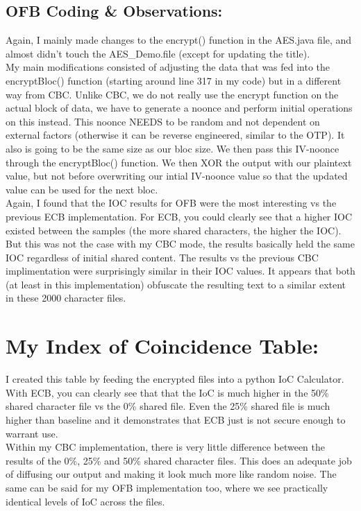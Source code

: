 \documentclass[10pt]{article}
\begin{document}
\begin{enumerate}
	\subsection{OFB Coding \& Observations: }
	\noindent Again, I mainly made changes to the encrypt() function in the AES.java file, and almost didn't touch the AES\_Demo.file (except for updating the title). \\
	My main modifications consisted of adjusting the data that was fed into the encryptBloc() function (starting around line 317 in my code) but in a different way from CBC. Unlike CBC, we do not really use the encrypt function on the actual block of data, we have to generate a noonce and perform initial operations on this instead. This noonce NEEDS to be random and not dependent on external factors (otherwise it can be reverse engineered, similar to the OTP). It also is going to be the same size as our bloc size. We then pass this IV-noonce through the encryptBloc() function. We then XOR the output with our plaintext value, but not before overwriting our intial IV-noonce value so that the updated value can be used for the next bloc.\\
	\newline
	\noindent Again, I found that the IOC results for OFB were the most interesting vs the previous ECB implementation. For ECB, you could clearly see that a higher IOC existed between the samples (the more shared characters, the higher the IOC). But this was not the case with my CBC mode, the results basically held the same IOC regardless of initial shared content. The results vs the previous CBC implimentation were surprisingly similar in their IOC values. It appears that both (at least in this implementation) obfuscate the resulting text to a similar extent in these 2000 character files. 
	
\end{enumerate}
\vspace{0.2in}
\section{My Index of Coincidence Table:}
\noindent I created this table by feeding the encrypted files into a python IoC Calculator. With ECB, you can clearly see that that the IoC is much higher in the 50\% shared character file vs the 0\% shared file. Even the 25\% shared file is much higher than baseline and it demonstrates that ECB just is not secure enough to warrant use. \\
Within my CBC implementation, there is very little difference between the results of the 0\%, 25\% and 50\% shared character files. This does an adequate job of diffusing our output and making it look much more like random noise. The same can be said for my OFB implementation too, where we see practically identical levels of IoC across the files.\\
\end{document}
